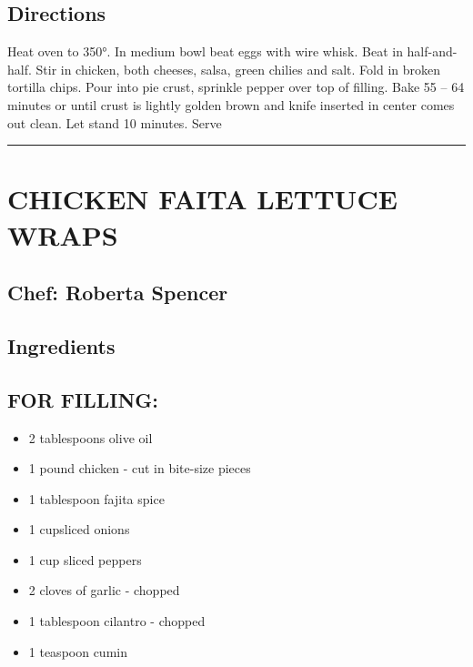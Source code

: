 \documentclass[
]{book}
\providecommand{\tightlist}{%
  \setlength{\itemsep}{0pt}\setlength{\parskip}{0pt}}
\begin{document}
\hypertarget{directions-48}{%
\subsection*{Directions}\label{directions-48}}


Heat oven to 350°. In medium bowl beat eggs with wire whisk. Beat in half-and-half. Stir in chicken,
both cheeses, salsa, green chilies and salt. Fold in broken tortilla chips.
Pour into pie crust, sprinkle pepper over top of filling. Bake 55 -- 64 minutes or until crust is lightly
golden brown and knife inserted in center comes out clean. Let stand 10 minutes. Serve

\begin{center}\rule{0.5\linewidth}{0.5pt}\end{center}

\hypertarget{chicken-faita-lettuce-wraps}{%
\section*{CHICKEN FAITA LETTUCE WRAPS}\label{chicken-faita-lettuce-wraps}}


\hypertarget{chef-roberta-spencer-16}{%
\subsection*{Chef: Roberta Spencer}\label{chef-roberta-spencer-16}}


\hypertarget{ingredients-49}{%
\subsection*{Ingredients}\label{ingredients-49}}


\hypertarget{for-filling}{%
\subsection*{FOR FILLING:}\label{for-filling}}


\begin{itemize}
\tightlist
\item
  2 tablespoons olive oil
\item
  1 pound chicken - cut in bite-size pieces
\item
  1 tablespoon fajita spice
\item
  1 cupsliced onions
\item
  1 cup sliced peppers
\item
  2 cloves of garlic - chopped
\item
  1 tablespoon cilantro - chopped
\item
  1 teaspoon cumin
\end{itemize}
\end{document}
